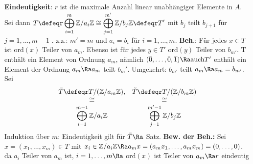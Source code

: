 \begin{Satz}
{        \textbf{Eindeutigkeit}:
            $r$ ist die maximale Anzahl linear unabhängiger Elemente in $A$. Sei
            dann $T \defeqr \displaystyle \bigoplus_{i=1}^m \mathbb{Z}/a_i\mathbb{Z} \cong
            \bigoplus_{j=1}^{m'}
            \mathbb{Z}/b_j\mathbb{Z} \defeqr T'$ mit $b_j$ teilt $b_{j+1}$ für $j
            =1,\dots,m-1$ . z.z.: $m' = m$ und $a_i =
            b_i$ für $i=1,\dots,m$. \smallskip \newline
            \textbf{Beh}.:
                Für jedes $x \in T$ ist ord$(x)$ Teiler von $a_m$. Ebenso ist
                für jedes $y \in T'$ ord$(y)$ Teiler von $b_{m'}$. T enthält ein
                Element von Ordnung $a_m$, nämlich $(\bar 0, \dots, \bar 0, \bar
                1) \Ra \mbox{auch} T'$ enthält ein Element der Ordnung $a_m \Ra
                a_m$ teilt $b_m'$. Umgekehrt: $b_{m'}$ teilt $a_m \Ra a_m =
                b_{m'}$. \newline
                Sei \[\begin{array}{cc} \bar T \defeqr T/(\mathbb{Z}/a_m
                \mathbb{Z}), & \tilde{T} \defeqr T/(\mathbb{Z}/b_m \mathbb{Z})
                \\ \cong   & \cong \\ \displaystyle \bigoplus_{i=1}^{m-1}
                \mathbb{Z}/a_i\mathbb{Z}   & \displaystyle 
                \bigoplus_{j=1}^{m'-1} 
                \mathbb{Z}/b_j\mathbb{Z} \end{array} \]
                Induktion über $m$: Eindeutigkeit gilt für $\bar{T} \Ra$ Satz.
            \newline
            \textbf{Bew. der Beh.:}
                Sei $x=(x_1,\dots,x_m) \in T$ mit $x_i \in \mathbb{Z}/a_i
                \mathbb{Z} \Ra a_m x = (a_m x_1, \dots, a_m x_m) = (0,\dots,0)$,
                da $a_i$ Teiler von $a_m$ ist, $i=1,\dots,m \Ra$ ord$(x)$ ist
                Teiler von $a_m \Ra r$ eindeutig
    }
\end{Satz}
